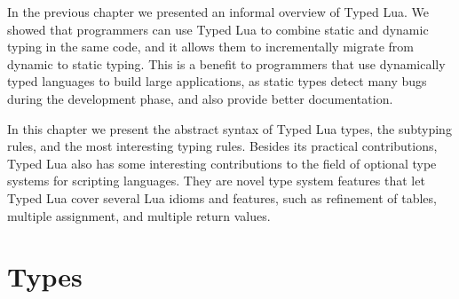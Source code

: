 
In the previous chapter we presented an informal overview of Typed Lua.
We showed that programmers can use Typed Lua to combine static and dynamic
typing in the same code, and it allows them to incrementally migrate from
dynamic to static typing.
This is a benefit to programmers that use dynamically typed languages
to build large applications, as static types detect many bugs
during the development phase, and also provide better documentation.

In this chapter we present the abstract syntax of Typed Lua types,
the subtyping rules, and the most interesting typing rules.
Besides its practical contributions, Typed Lua also has some interesting
contributions to the field of optional type systems for scripting
languages.
They are novel type system features that let Typed Lua cover several Lua idioms
and features, such as refinement of tables, multiple assignment, and multiple return values.

\section{Types}
\label{sec:types}

